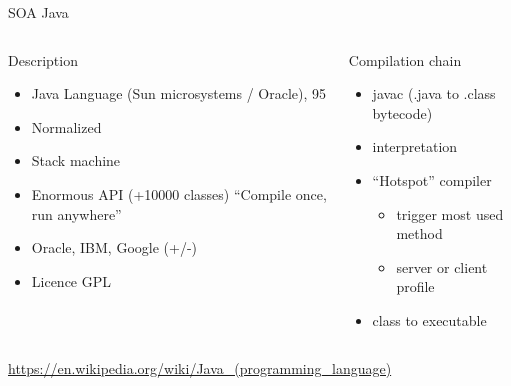 %
\begin{Frame}{SOA Java}
  \begin{columns}[t]
    \begin{column}{\BW} %
      \begin{block}{Description}
        \begin{itemize}
        \item Java Language (Sun microsystems / Oracle), 95
        \item Normalized
        \item Stack machine
        \item Enormous API (+10000 classes) ``Compile once, run anywhere''
        \item Oracle, IBM, Google (+/-)
        \item Licence GPL
        \end{itemize}
      \end{block} 
    \end{column}
    
    \begin{column}{\BW} %
      \begin{block}{Compilation chain}
        \begin{itemize}
        \item javac (.java to .class bytecode)
        \item interpretation
        \item ``Hotspot'' compiler\TBD
          \begin{itemize}
          \item trigger most used method
          \item server or client profile
          \end{itemize}
        \item class to executable
        \end{itemize}
      \end{block}   
    \end{column}
  \end{columns}  
\url{https://en.wikipedia.org/wiki/Java_(programming_language)}
\end{Frame}


